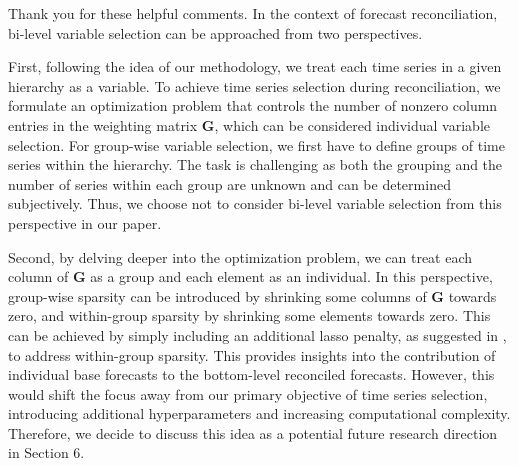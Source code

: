 \documentclass[11pt,a4paper,]{article}
\renewenvironment{quote}
               {\list{}{\rightmargin\leftmargin}%
                \item\relax\color[RGB]{0,150,0}}
               {\endlist}
\begin{document}
\begin{quote}
Thank you for these helpful comments. In the context of forecast
reconciliation, bi-level variable selection can be approached from two
perspectives.

First, following the idea of our methodology, we treat each time series
in a given hierarchy as a variable. To achieve time series selection
during reconciliation, we formulate an optimization problem that
controls the number of nonzero column entries in the weighting matrix
\(\bm{G}\), which can be considered individual variable selection. For
group-wise variable selection, we first have to define groups of time
series within the hierarchy. The task is challenging as both the
grouping and the number of series within each group are unknown and can
be determined subjectively. Thus, we choose not to consider bi-level
variable selection from this perspective in our paper.

Second, by delving deeper into the optimization problem, we can treat
each column of \(\bm{G}\) as a group and each element as an individual.
In this perspective, group-wise sparsity can be introduced by shrinking
some columns of \(\bm{G}\) towards zero, and within-group sparsity by
shrinking some elements towards zero. This can be achieved by simply
including an additional lasso penalty, as suggested in
\textcite{Simon2013-sp}, to address within-group sparsity. This provides
insights into the contribution of individual base forecasts to the
bottom-level reconciled forecasts. However, this would shift the focus
away from our primary objective of time series selection, introducing
additional hyperparameters and increasing computational complexity.
Therefore, we decide to discuss this idea as a potential future research
direction in Section 6.
\end{quote}
\end{document}
